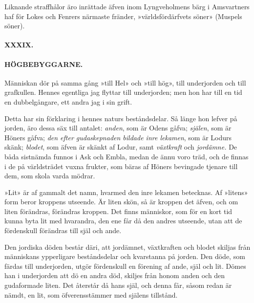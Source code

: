Liknande straffhålor äro inrättade äfven inom Lyngveholmens bärg i
Amsvartners haf för Lokes och Fenrers närmaste fränder,
»världsfördärfvets söner» (Muspels söner).

\protect\hypertarget{lb1625905.xhtmlux5cux23start189}{}{}\protect\hypertarget{lb1625905.xhtmlux5cux23start189-a}{}{}\protect\hypertarget{lb1625905.xhtmlux5cux23start189-b}{}{}\protect\hypertarget{lb1625905.xhtmlux5cux23start189-c}{}{}\protect\hypertarget{lb1625905.xhtmlux5cux23start189-d}{}{}

\paragraph{XXXIX.}

\paragraph{HÖGBEBYGGARNE.}

Människan dör på samma gång »till Hel» och »till hög», till underjorden
och till grafkullen. Hennes egentliga jag flyttar till underjorden; men
hon har till en tid en dubbelgångare, ett andra jag i sin grift.

Detta har sin förklaring i hennes naturs beståndsdelar. Så länge hon
lefver på jorden, äro dessa säx till antalet: \emph{anden}, som är Odens
gåfva; \emph{själen}, som är Höners gåfva; \emph{den efter gudaskepnaden
bildade inre lekamen}, som är Lodurs skänk; \emph{blodet}, som äfven är
skänkt af Lodur, samt \emph{växtkraft} och \emph{jordämne.} De båda
sistnämda funnos i Ask och Embla, medan de ännu voro träd, och de finnas
i de på världsträdet vuxna frukter, som bäras af Höners bevingade
tjenare till dem, som skola varda mödrar.

»Lit» är af gammalt det namn, hvarmed den inre lekamen betecknas. Af
»litens» form beror kroppens utseende. Är liten skön, så är kroppen det
äfven, och om liten förändras, förändras kroppen. Det finns människor,
som för en kort tid kunna byta lit med hvarandra, den ene får då den
andres utseende, utan att de fördenskull förändras till själ och ande.

Den jordiska döden består däri, att jordämnet, växtkraften och blodet
skiljas från människans ypperligare beståndsdelar och kvarstanna på
jorden. Den döde, som färdas till underjorden, utgör fördenskull en
förening af ande, själ och lit. Dömes han i underjorden att dö en andra
död, skiljes från honom anden och den gudaformade liten. Det återstår då
hans själ, och denna får, såsom redan är nämdt, en lit, som
öfverensstämmer med själens tillstånd.

